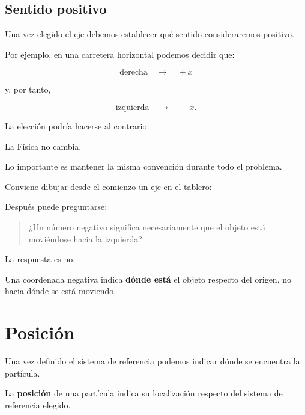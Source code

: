 \subsection{Sentido positivo}

Una vez elegido el eje debemos establecer qué sentido consideraremos
positivo.

Por ejemplo, en una carretera horizontal podemos decidir que:

\[
\text{derecha}\quad\longrightarrow\quad +x
\]

y, por tanto,

\[
\text{izquierda}\quad\longrightarrow\quad -x.
\]

La elección podría hacerse al contrario.

La Física no cambia.

Lo importante es mantener la misma convención durante todo el problema.

\begin{notapedagogica}
Conviene dibujar desde el comienzo un eje en el tablero:

\begin{center}
\end{center}

Después puede preguntarse:

\begin{quote}
¿Un número negativo significa necesariamente que el objeto está moviéndose
hacia la izquierda?
\end{quote}

La respuesta es no.

Una coordenada negativa indica \textbf{dónde está} el objeto respecto del
origen, no hacia dónde se está moviendo.
\end{notapedagogica}


\section{Posición}

Una vez definido el sistema de referencia podemos indicar dónde se encuentra
la partícula.

\begin{definicion}[Posición]
La \textbf{posición} de una partícula indica su localización respecto del
sistema de referencia elegido.
\end{definicion}


